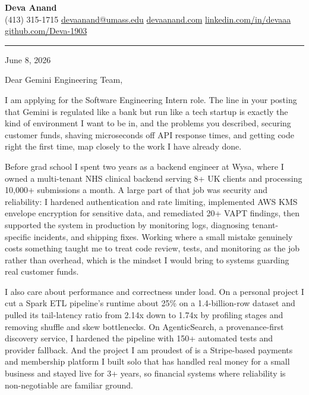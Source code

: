 \documentclass[letterpaper,11pt]{article}
\begin{document}
\pagestyle{empty}
\begin{center}
    {\LARGE \bfseries \textcolor{ResumeNavy}{Deva Anand}} \\ \vspace{4pt}
    \small
    (413) 315-1715 \enspace\textbar\enspace
    \href{mailto:devaanand@umass.edu}{devaanand@umass.edu} \enspace\textbar\enspace
    \href{https://devaanand.com}{devaanand.com} \enspace\textbar\enspace
    \href{https://linkedin.com/in/devaaa/}{linkedin.com/in/devaaa} \enspace\textbar\enspace
    \href{https://github.com/Deva-1903}{github.com/Deva-1903}
\end{center}
\vspace{6pt}

\textcolor{ResumeNavy}{\rule{\textwidth}{0.8pt}}

\vspace{4pt}

June 8, 2026

Dear Gemini Engineering Team,

I am applying for the Software Engineering Intern role. The line in your posting that Gemini is regulated like a bank but run like a tech startup is exactly the kind of environment I want to be in, and the problems you described, securing customer funds, shaving microseconds off API response times, and getting code right the first time, map closely to the work I have already done.

Before grad school I spent two years as a backend engineer at Wysa, where I owned a multi-tenant NHS clinical backend serving 8+ UK clients and processing 10,000+ submissions a month. A large part of that job was security and reliability: I hardened authentication and rate limiting, implemented AWS KMS envelope encryption for sensitive data, and remediated 20+ VAPT findings, then supported the system in production by monitoring logs, diagnosing tenant-specific incidents, and shipping fixes. Working where a small mistake genuinely costs something taught me to treat code review, tests, and monitoring as the job rather than overhead, which is the mindset I would bring to systems guarding real customer funds.

I also care about performance and correctness under load. On a personal project I cut a Spark ETL pipeline's runtime about 25\% on a 1.4-billion-row dataset and pulled its tail-latency ratio from 2.14x down to 1.74x by profiling stages and removing shuffle and skew bottlenecks. On AgenticSearch, a provenance-first discovery service, I hardened the pipeline with 150+ automated tests and provider fallback. And the project I am proudest of is a Stripe-based payments and membership platform I built solo that has handled real money for a small business and stayed live for 3+ years, so financial systems where reliability is non-negotiable are familiar ground.
\end{document}
